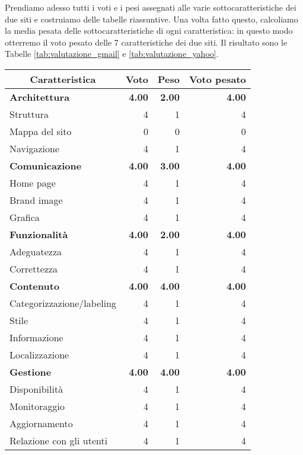 		Prendiamo adesso tutti i voti e i pesi assegnati alle varie sottocaratteristiche dei due siti e costruiamo delle tabelle riassuntive. Una volta fatto questo, calcoliamo la  media pesata delle sottocaratteristiche di ogni caratteristica: in questo modo otterremo il voto pesato delle 7 caratteristiche dei due siti. Il risultato sono le Tabelle \ref{tab:valutazione_gmail} e \ref{tab:valutazione_yahoo}.
		\begin{table}[h!]
			\centering
			\begin{tabular}{|l|r|r|r|}
				\hline
				\multicolumn{1}{|c|}{Caratteristica} & \multicolumn{1}{c|}{Voto} & \multicolumn{1}{c|}{Peso} & \multicolumn{1}{c|}{Voto pesato}\\ \hline\hline
				\textbf{Architettura} & \textbf{4.00} & \textbf{2.00} & \textbf{4.00}\\ \hline
				Struttura & 4 & 1 & 4\\ \hline
				Mappa del  sito & 0 & 0 & 0\\ \hline
				Navigazione & 4 & 1 & 4\\ \hline
				\textbf{Comunicazione} & \textbf{4.00} & \textbf{3.00} & \textbf{4.00}\\ \hline
				Home page & 4 & 1 & 4\\ \hline
				Brand image & 4 & 1 & 4\\ \hline
				Grafica & 4 & 1 & 4\\ \hline
				\textbf{Funzionalità} & \textbf{4.00} & \textbf{2.00} & \textbf{4.00}\\ \hline
				Adeguatezza & 4 & 1 & 4\\ \hline
				Correttezza & 4 & 1 & 4\\ \hline
				\textbf{Contenuto} & \textbf{4.00} & \textbf{4.00} & \textbf{4.00}\\ \hline
				Categorizzazione/labeling & 4 & 1 & 4\\ \hline
				Stile & 4 & 1 & 4\\ \hline
				Informazione & 4 & 1 & 4\\ \hline
				Localizzazione & 4 & 1 & 4\\ \hline
				\textbf{Gestione} & \textbf{4.00} & \textbf{4.00} & \textbf{4.00}\\ \hline
				Disponibilità & 4 & 1 & 4\\ \hline
				Monitoraggio & 4 & 1 & 4\\ \hline
				Aggiornamento & 4 & 1 & 4\\ \hline
				Relazione con gli utenti & 4 & 1 & 4\\ \hline

\end{tabular}
\end{table}
